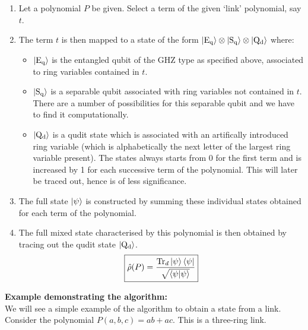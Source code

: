\documentclass{scrartcl}
\begin{document}
\begin{enumerate}
    \item Let a polynomial $P$ be given. Select a term of the given `link' polynomial, say $t$. 
    \item The term $t$ is then mapped to a state of the form $\ket{\mathrm{E_q}}\otimes\ket{\mathrm{S_q}}\otimes\ket{\mathrm{Q_d}}$ where: 
    \begin{itemize}
        \item $\ket{\mathrm{E_q}}$ is the entangled qubit of the GHZ type as specified above, associated to ring variables contained in $t$.
        \item $\ket{\mathrm{S_q}}$ is a separable qubit associated with ring variables not contained in $t$. There are a number of possibilities for this separable qubit and we have to find it computationally.
        \item $\ket{\mathrm{Q_d}}$ is a qudit state which is associated with an artifically introduced ring variable (which is alphabetically the next letter of the largest ring variable present). The states always starts from 0 for the first term and is increased by 1 for each successive term of the polynomial. This will later be traced out, hence is of less significance. 
    \end{itemize}
    \item The full state $\ket{\psi}$ is constructed by summing these individual states obtained for each term of the polynomial. 
    \item The full mixed state characterised by this polynomial is then obtained by tracing out the qudit state $\ket{\mathrm{Q_d}}$.
    $$\boxed{\hat{\rho}(P)=\frac{\Tr_d{\ket{\psi}\bra{\psi}}}{\sqrt{\braket{\psi|\psi}}}}$$
\end{enumerate}
\textbf{Example demonstrating the algorithm:} \\[0.3cm]
We will see a simple example of the algorithm to obtain a state from a link. Consider the polynomial $P(a,b,c) = ab+ac$. This is a three-ring link. 
\end{document}

